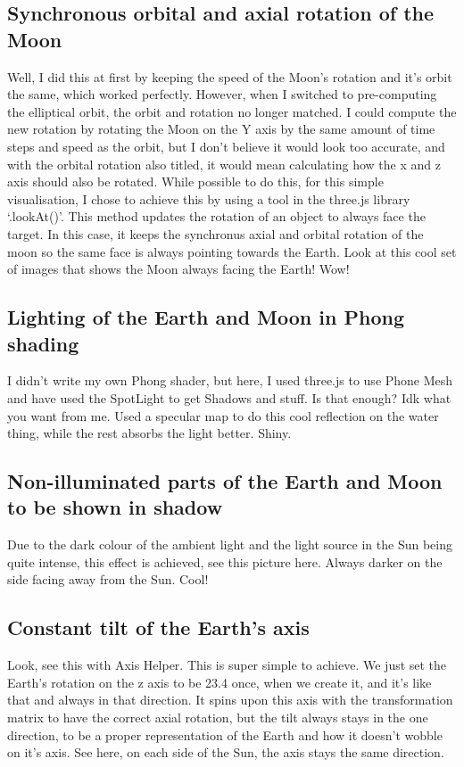 \documentclass[12pt]{article}
\begin{document}
\subsection{Synchronous orbital and axial rotation of the Moon}
Well, I did this at first by keeping the speed of the Moon's rotation and it's orbit the same, which worked perfectly. However, when I switched to pre-computing the elliptical orbit, the orbit and rotation no longer matched. I could compute the new rotation by rotating the Moon on the Y axis by the same amount of time steps and speed as the orbit, but I don't believe it would look too accurate, and with the orbital rotation also titled, it would mean calculating how the x and z axis should also be rotated. While possible to do this, for this simple visualisation, I chose to achieve this by using a tool in the three.js library `.lookAt()'. This method updates the rotation of an object to always face the target. In this case, it keeps the synchronus axial and orbital rotation of the moon so the same face is always pointing towards the Earth. Look at this cool set of images that shows the Moon always facing the Earth! Wow!

\subsection{Lighting of the Earth and Moon in Phong shading}
I didn't write my own Phong shader, but here, I used three.js to use Phone Mesh and have used the SpotLight to get Shadows and stuff. Is that enough? Idk what you want from me. Used a specular map to do this cool reflection on the water thing, while the rest absorbs the light better. Shiny.

\subsection{Non-illuminated parts of the Earth and Moon to be shown in shadow}
Due to the dark colour of the ambient light and the light source in the Sun being quite intense, this effect is achieved, see this picture here. Always darker on the side facing away from the Sun. Cool!

\subsection{Constant tilt of the Earth's axis}
Look, see this with Axis Helper. This is super simple to achieve. We just set the Earth's rotation on the z axis to be 23.4 once, when we create it, and it's like that and always in that direction. It spins upon this axis with the transformation matrix to have the correct axial rotation, but the tilt always stays in the one direction, to be a proper representation of the Earth and how it doesn't wobble on it's axis. See here, on each side of the Sun, the axis stays the same direction.
\end{document}
